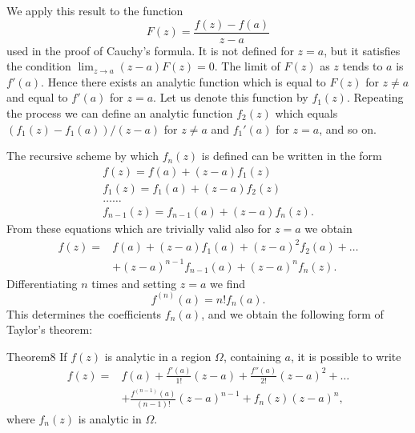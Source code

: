 We apply this result to the function
\begin{equation*}
F (z) = \frac {f (z) - f (a)}{z - a}
\end{equation*}
used in the proof of Cauchy's formula. It is not defined for $z = a$, but it satisfies the condition $\lim_{z \to a} (z - a) F(z) = 0$. The limit of $F(z)$ as $z$ tends to $a$ is $f'(a)$. Hence there exists an analytic function which is equal to $F(z)$ for $z \neq a$ and equal to $f'(a)$ for $z = a$. Let us denote this function by $f_1(z)$. Repeating the process we can define an analytic function $f_2(z)$ which equals $(f_1(z) - f_1(a)) / (z - a)$ for $z \neq a$ and $f_1'(a)$ for $z = a$, and so on.

The recursive scheme by which $f_{n}(z)$ is defined can be written in the form
\begin{equation*}
\begin{array}{l} f (z) = f (a) + (z - a) f _ {1} (z) \\ f _ {1} (z) = f _ {1} (a) + (z - a) f _ {2} (z) \\ \dots \dots \\ f _ {n - 1} (z) = f _ {n - 1} (a) + (z - a) f _ {n} (z). \end{array}
\end{equation*}
From these equations which are trivially valid also for $z = a$ we obtain
\begin{equation*}
\begin{aligned}
f(z)={}&f(a)+(z-a)f_1(a)+(z-a)^2f_2(a)+\dots\\
&+(z-a)^{n-1}f_{n-1}(a)+(z-a)^nf_n(z).
\end{aligned}
\end{equation*}
Differentiating $n$ times and setting $z = a$ we find
\begin{equation*}
f ^ {(n)} (a) = n! f _ {n} (a).
\end{equation*}
This determines the coefficients $f_{n}(a)$, and we obtain the following form of Taylor's theorem:

\begin{originalstatement}{Theorem}{8}\label{thm:4.8}
If $f(z)$ is analytic in a region $\Omega$, containing $a$, it is possible to write
\begin{equation*}
\begin{aligned}
f(z)={}&f(a)+\frac{f'(a)}{1!}(z-a)+\frac{f''(a)}{2!}(z-a)^2+\dots\\
&+\frac{f^{(n-1)}(a)}{(n-1)!}(z-a)^{n-1}+f_n(z)(z-a)^n,
\end{aligned}\tag{28}\label{eq:4.28}
\end{equation*}
where $f_{n}(z)$ is analytic in $\Omega$.

\end{originalstatement}

